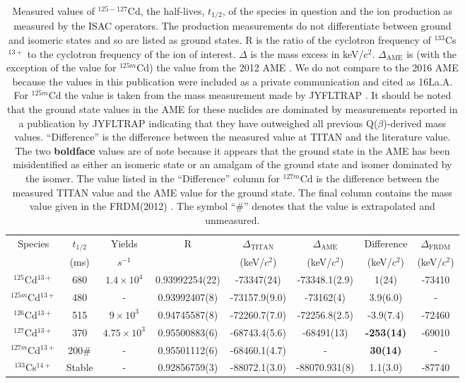 \documentclass[twocolumn,prc,showpacs,preprintnumbers,amsmath,amssymb,superscriptaddress,nofootinbib,aps,10pt]{revtex4-1}
\begin{document}
\begin{table}[ht]
  \centering
  \caption{Measured values of $^{125-127}$Cd, the half-lives, $t_{1/2}$, of the species in question and the ion production as measured by the ISAC operators. The production measurements do not differentiate between ground and isomeric states and so are listed as ground states. R is the ratio of the cyclotron frequency of $^{133}$Cs$^{13+}$ to the cyclotron frequency of the ion of interest. $\Delta$ is the mass excess in keV/c$^2$. $\Delta_{\mathrm{AME}}$ is (with the exception of the value for $^{125m}$Cd) the value from the 2012 AME \cite{Audi2012,Wang2012}. We do not compare to the 2016 AME \cite{Huang2017,Huang2017a} because the values in this publication were included as a private communication and cited as 16La.A. For $^{125m}$Cd the value is taken from the mass measurement made by JYFLTRAP \cite{Kankainen2013}. It should be noted that the ground state values in the AME for these nuclides are dominated by measurements reported in a publication by JYFLTRAP \cite{Hakala2012} indicating that they have outweighed all previous Q($\beta$)-derived mass values. ``Difference'' is the difference between the measured value at TITAN and the literature value. The two \textbf{boldface} values are of note because it appears that the ground state in the AME has been misidentified as either an isomeric state or an amalgam of the ground state and isomer dominated by the isomer. The value listed in the ``Difference'' column for $^{127m}$Cd is the difference between the measured TITAN value and the AME value for the ground state. The final column contains the mass value given in the FRDM(2012) \cite{Moller2016}. The symbol ``\#'' denotes that the value is extrapolated and unmeasured.}
    \begin{tabular*}{\textwidth}{@{\extracolsep{\fill}} cccccccc}
    \hline
    Species & $t_{1/2}$ \cite{Audi2012a} & Yields & R & $\Delta_{\mathrm{TITAN}}$ & $\Delta_{\mathrm{AME}}$ & Difference & $\Delta_{\mathrm{FRDM}}$ \\
          & (ms) & $s^{-1}$ &  & (keV/$c^2$) & (keV/$c^2$) & (keV/$c^2$) & (keV/$c^2$) \\
    \hline
    $^{125}$Cd$^{13+}$ & 680 & $1.4 \times 10^4$ & 0.93992254(22) & -73347(24) & -73348.1(2.9) & 1(24) & -73410 \\
    $^{125m}$Cd$^{13+}$ & 480 & - & 0.93992407(8) & -73157.9(9.0) & -73162(4) \cite{Kankainen2013} & 3.9(6.0) & - \\
    \hline
    $^{126}$Cd$^{13+}$ & 515 & $9 \times 10^3$ & 0.94745587(8) & -72260.7(7.0) & -72256.8(2.5) & -3.9(7.4) & -72460 \\
    \hline
    $^{127}$Cd$^{13+}$ & 370 & $4.75\times 10^3$ & 0.95500883(6) & -68743.4(5.6) & -68491(13) & \textbf{-253(14)} & -69010 \\
    $^{127m}$Cd$^{13+}$ & 200\# & - & 0.95501112(6) & -68460.1(4.7) & - & \textbf{30(14)} & - \\
    \hline
    $^{133}$Cs$^{14+}$ & Stable & - & 0.92856759(3) & -88072.1(3.0) & -88070.931(8) & 1.1(3.0) & -87740 \\
    \hline
    \end{tabular*}%
  \label{tab:values}%
\end{table}%
\end{document}
